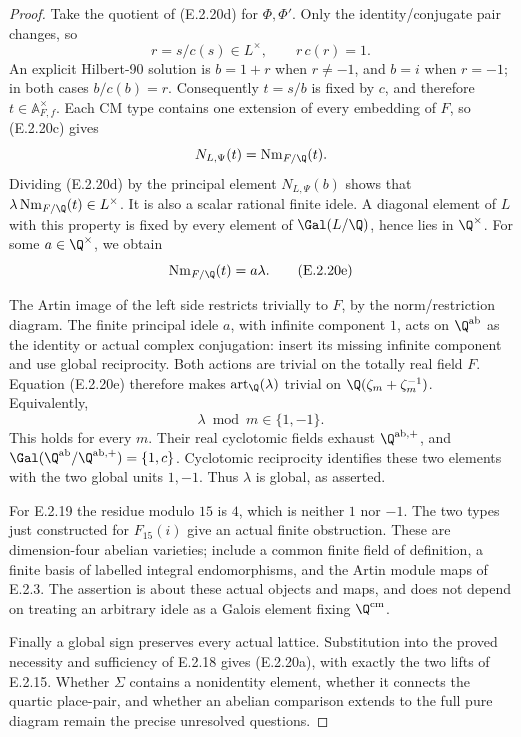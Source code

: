 \begin{proof}
Take the quotient of (E.2.20d) for \(\Phi,\Phi'\).
Only the identity/conjugate pair changes, so
\[
 r=s/c(s)\in L^\times,\qquad r\,c(r)=1.
\]
An explicit Hilbert-90 solution is
\(b=1+r\) when \(r\ne-1\), and \(b=i\) when \(r=-1\);
in both cases \(b/c(b)=r\).
Consequently \(t=s/b\) is fixed by \(c\), and therefore
\(t\in\mathbb A_{F,f}^{\times}\).
Each CM type contains one extension of every embedding
of \(F\), so (E.2.20c) gives
\[
 N_{L,\Psi}(t)=\operatorname{Nm}_{F/\Q}(t).
\]
Dividing (E.2.20d) by the principal element
\(N_{L,\Psi}(b)\) shows that
\(\lambda\operatorname{Nm}_{F/\Q}(t)\in L^\times\).
It is also a scalar rational finite idele. A diagonal
element of \(L\) with this property is fixed by every
element of \(\Gal(L/\Q)\), hence lies in \(\Q^\times\).
For some \(a\in\Q^\times\), we obtain
\[
 \operatorname{Nm}_{F/\Q}(t)=a\lambda.
 \tag{E.2.20e}
\]

The Artin image of the left side restricts trivially
to \(F\), by the norm/restriction diagram.
The finite principal idele \(a\), with infinite
component \(1\), acts on \(\Q^{\mathrm{ab}}\) as
the identity or actual complex conjugation:
insert its missing infinite component and use
global reciprocity. Both actions are trivial on
the totally real field \(F\).
Equation (E.2.20e) therefore makes
\(\operatorname{art}_{\Q}(\lambda)\) trivial on
\(\Q(\zeta_m+\zeta_m^{-1})\). Equivalently,
\[
 \lambda\bmod m\in\{1,-1\}.
\]
This holds for every \(m\). Their real cyclotomic
fields exhaust \(\Q^{\mathrm{ab},+}\), and
\(\Gal(\Q^{\mathrm{ab}}/\Q^{\mathrm{ab},+})
=\{1,c\}\). Cyclotomic reciprocity identifies these
two elements with the two global units \(1,-1\).
Thus \(\lambda\) is global, as asserted.

For E.2.19 the residue modulo \(15\) is \(4\), which
is neither \(1\) nor \(-1\). The two types just
constructed for \(F_{15}(i)\) give an actual finite
obstruction. These are dimension-four abelian
varieties; include a common finite field of
definition, a finite basis of labelled integral
endomorphisms, and the Artin module maps of E.2.3.
The assertion is about these actual objects and
maps, and does not depend on treating an arbitrary
idele as a Galois element fixing \(\Q^{\mathrm{cm}}\).

Finally a global sign preserves every actual lattice.
Substitution into the proved necessity and sufficiency
of E.2.18 gives (E.2.20a), with exactly the two lifts
of E.2.15. Whether \(\Sigma\) contains a nonidentity
element, whether it connects the quartic place-pair,
and whether an abelian comparison extends to the full
pure diagram remain the precise unresolved questions.
\end{proof}
